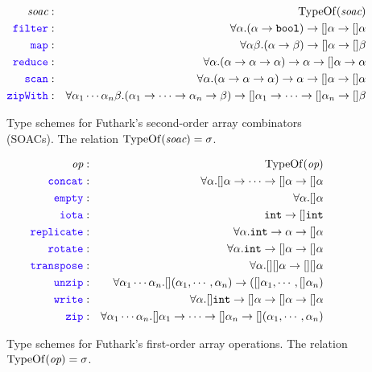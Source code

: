 \documentclass[11pt]{book}
\begin{document}
\begin{figure}
  \begin{eqnarray*}
\id{soac} & : & \mathrm{TypeOf}(\id{soac}) \\
    \fop{filter} & : & \forall \alpha. (\alpha \rarr \mathtt{bool}) \rarr []\alpha \rarr []\alpha\\
    \fop{map} & : & \forall \alpha\beta. (\alpha \rarr \beta) \rarr []\alpha \rarr []\beta\\
    \fop{reduce} & : & \forall \alpha. (\alpha \rarr \alpha \rarr \alpha) \rarr \alpha \rarr []\alpha \rarr \alpha\\
    \fop{scan} & : & \forall \alpha. (\alpha \rarr \alpha \rarr \alpha) \rarr \alpha \rarr []\alpha \rarr []\alpha\\
    \fop{zipWith} & : & \forall \alpha_1\cdots\alpha_n\beta. (\alpha_1\rarr\cdots\rarr\alpha_n \rarr \beta) \rarr []\alpha_1 \rarr\cdots\rarr []\alpha_n \rarr []\beta
  \end{eqnarray*}
  \caption{Type schemes for Futhark's second-order array combinators (SOACs). The relation $\mathrm{TypeOf}(\mbox{\it{soac}}) = \sigma$.}
  \label{fig:soactypeschemes}
\end{figure}

\begin{figure}
  \begin{eqnarray*}
\id{op} & : & \mathrm{TypeOf}(\id{op}) \\
    \fop{concat} & : & \forall \alpha. []\alpha \rarr \cdots \rarr []\alpha \rarr []\alpha \\
    \fop{empty} & : & \forall \alpha. []\alpha \\
    \fop{iota} & : & \kw{int} \rarr []\kw{int} \\
    \fop{replicate} & : & \forall \alpha. \kw{int} \rarr \alpha \rarr []\alpha\\
    \fop{rotate} & : & \forall \alpha. \kw{int} \rarr []\alpha \rarr []\alpha\\
    \fop{transpose} & : & \forall \alpha. [][]\alpha \rarr [][]\alpha\\
    \fop{unzip} & : & \forall \alpha_1\cdots\alpha_n. [](\alpha_1,\cdots,\alpha_n) \rarr ([]\alpha_1,\cdots,[]\alpha_n) \\
    \fop{write} & : & \forall \alpha. []\kw{int} \rarr []\alpha \rarr []\alpha \rarr []\alpha \\
    \fop{zip} & : & \forall \alpha_1\cdots\alpha_n. []\alpha_1\rarr\cdots\rarr[]\alpha_n \rarr [](\alpha_1,\cdots,\alpha_n)
  \end{eqnarray*}
  \caption{Type schemes for Futhark's first-order array operations. The relation $\mathrm{TypeOf}(\mbox{\it{op}}) = \sigma$.}
  \label{fig:foactypeschemes}
\end{figure}
\end{document}
